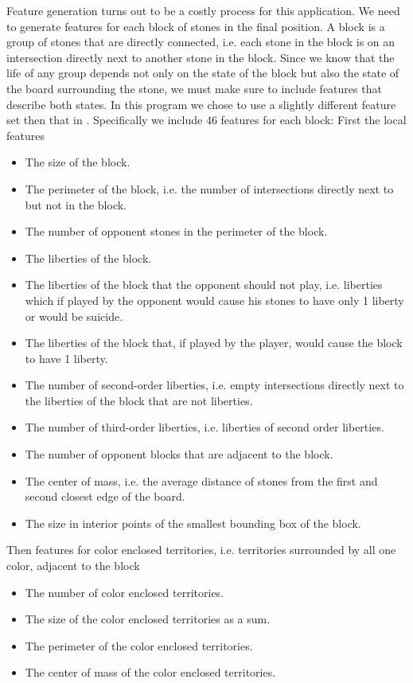 \documentclass[11pt,letterpaper]{article}
\begin{document}
Feature generation turns out to be a costly process for this application. We need to generate features for each block of stones in
the final position. A block is a group of stones that are directly connected, i.e. each stone in the block is on an intersection directly
next to another stone in the block. Since we know that the life of any group depends not only on the state of the block but also
the state of the board surrounding the stone, we must make sure to include features that describe both states. In this program
we chose to use a slightly different feature set then that in \cite{vdW:04}. Specifically we include 46 features for each block:
First the local features
\begin{itemize}
  \item The size of the block.
  \item The perimeter of the block, i.e. the number of intersections directly next to but not in the block.
  \item The number of opponent stones in the perimeter of the block.
  \item The liberties of the block.
  \item The liberties of the block that the opponent should not play, i.e. liberties which if played by the opponent would cause his
    stones to have only 1 liberty or would be suicide.
  \item The liberties of the block that, if played by the player, would cause the block to have 1 liberty.
  \item The number of second-order liberties, i.e. empty intersections directly next to the liberties of the block that are not liberties.
  \item The number of third-order liberties, i.e. liberties of second order liberties.
  \item The number of opponent blocks that are adjacent to the block.
  \item The center of mass, i.e. the average distance of stones from the first and second closest edge of the board.
  \item The size in interior points of the smallest bounding box of the block.
\end{itemize}
Then features for color enclosed territories, i.e. territories surrounded by all one color, adjacent to the block
\begin{itemize}
  \item The number of color enclosed territories.
  \item The size of the color enclosed territories as a sum.
  \item The perimeter of the color enclosed territories.
  \item The center of mass of the color enclosed territories.
\end{itemize}
\end{document}
